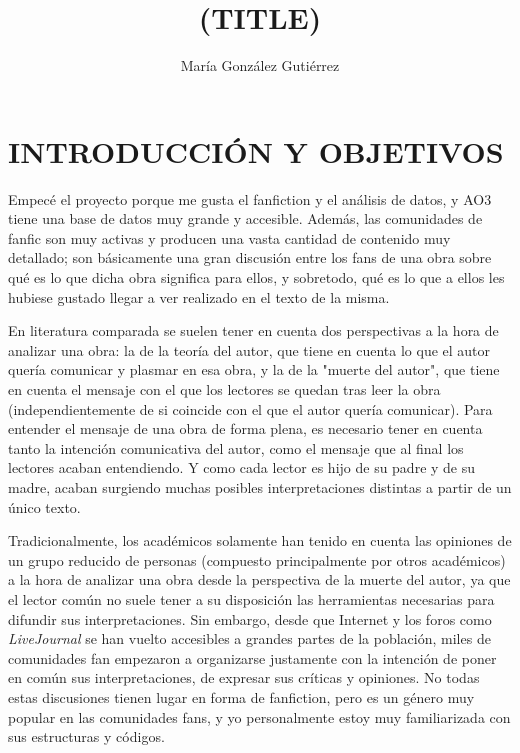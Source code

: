 \documentclass{pre-tfg}
\title{(TITLE)}
\author{María González Gutiérrez}
\begin{document}
\maketitle
\tableofcontents

\newpage


\section{INTRODUCCIÓN Y OBJETIVOS}

Empecé el proyecto porque me gusta el fanfiction y el análisis de datos, y AO3 tiene una base de datos muy grande  y accesible. Además, las comunidades de fanfic son muy activas y producen una vasta cantidad de contenido muy detallado; son básicamente una gran discusión entre los fans de una obra sobre qué es lo que dicha obra significa para ellos, y sobretodo, qué es lo que a ellos les hubiese gustado llegar a ver realizado en el texto de la misma.

En literatura comparada se suelen tener en cuenta dos perspectivas a la hora de analizar una obra: la de la teoría del autor, que tiene en cuenta lo que el autor quería comunicar y plasmar en esa obra, y la de la "muerte del autor"\cite{Barthes}, que tiene en cuenta el mensaje con el que los lectores se quedan tras leer la obra (independientemente de si coincide con el que el autor quería comunicar).
Para entender el mensaje de una obra de forma plena\cite{ellis_2018}, es necesario tener en cuenta tanto la intención comunicativa del autor, como el mensaje que al final los lectores acaban entendiendo. Y como cada lector es hijo de su padre y de su madre, acaban surgiendo muchas posibles interpretaciones distintas a partir de un único texto.

Tradicionalmente, los académicos solamente han tenido en cuenta las opiniones de un grupo reducido de personas (compuesto principalmente por otros académicos) a la hora de analizar una obra desde la perspectiva de la muerte del autor, ya que el lector común no suele tener a su disposición las herramientas necesarias para difundir sus interpretaciones. Sin embargo, desde que Internet y los foros como \textit{LiveJournal} se han vuelto accesibles a grandes partes de la población, miles de comunidades fan empezaron a organizarse justamente con la intención de poner en común sus interpretaciones, de expresar sus críticas y opiniones. No todas estas discusiones tienen lugar en forma de fanfiction, pero es un género muy popular en las comunidades fans, y yo personalmente estoy muy familiarizada con sus estructuras y códigos.
\end{document}
